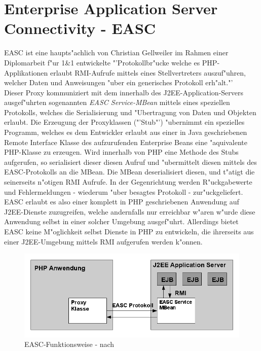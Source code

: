 \section{Enterprise Application Server Connectivity - EASC}
\label{sec:background:easc}
EASC ist eine haupts"achlich von Christian Gellweiler im Rahmen einer Diplomarbeit f"ur 1\&1 entwickelte 
"'Protokollbr"ucke welche es PHP-Applikationen erlaubt RMI-Aufrufe mittels eines Stellvertreters auszuf"uhren, welcher
Daten und Anweisungen "uber ein generisches Protokoll erh"alt."' \cite{EASC}\\
Dieser Proxy kommuniziert mit dem innerhalb des J2EE-Application-Servers ausgef"uhrten sogenannten \emph{EASC Service-MBean} mittels
eines speziellen Protokolls, welches die Serialisierung und "Ubertragung von Daten und Objekten erlaubt.
Die Erzeugung der Proxyklassen ("'Stub"') "ubernimmt ein spezielles Programm, welches es dem Entwickler erlaubt aus einer in Java geschriebenen
Remote Interface Klasse des aufzurufenden Enterprise Beans eine "aquivalente PHP-Klasse zu erzeugen.
Wird innerhalb von PHP eine Methode des Stubs aufgerufen, so serialisiert dieser diesen Aufruf und "ubermittelt diesen mittels des EASC-Protokolls
an die MBean. Die MBean deserialisiert diesen, und t"atigt die seinerseits n"otigen RMI Aufrufe.
In der Gegenrichtung werden R"uckgabewerte und Fehlermeldungen - wiederum "uber besagtes Protokoll - zur"uckgeliefert.
EASC erlaubt es also einer komplett in PHP geschriebenen Anwendung auf J2EE-Dienste zuzugreifen, welche andernfalls nur
erreichbar w"aren w"urde diese Anwendung selbst in einer solcher Umgebung ausgef"uhrt. Allerdings bietet EASC keine M"oglichkeit
selbst Dienste in PHP zu entwickeln, die ihrerseits aus einer J2EE-Umgebung mittels RMI aufgerufen werden k"onnen.
\begin{figure}[h]
\includegraphics[width=\textwidth]{intro/img/easc.png}
\caption{EASC-Funktionsweise - nach \cite{EASC}}
\label{fig:easc}
\end{figure}

